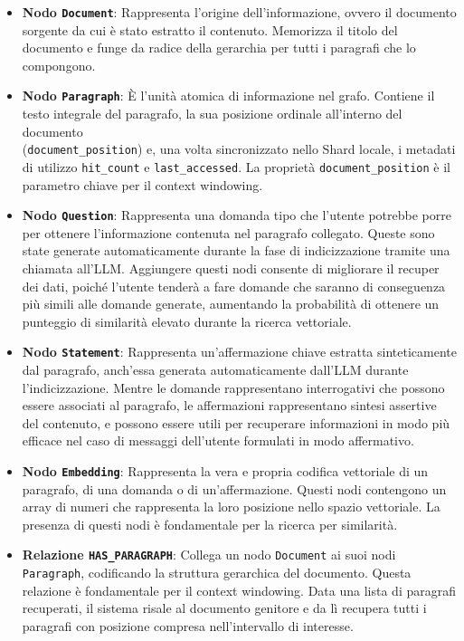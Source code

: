\begin{itemize}
    \item \textbf{Nodo \texttt{Document}}: Rappresenta l'origine dell'informazione, ovvero il documento sorgente da cui è stato estratto il contenuto. Memorizza il titolo del documento e funge da radice della gerarchia per tutti i paragrafi che lo compongono.

    \item \textbf{Nodo \texttt{Paragraph}}: È l'unità atomica di informazione nel grafo. Contiene il testo integrale del paragrafo, la sua posizione ordinale all'interno del documento \\ (\texttt{document\_position}) e, una volta sincronizzato nello Shard locale, i metadati di utilizzo \texttt{hit\_count} e \texttt{last\_accessed}. La proprietà \texttt{document\_position} è il parametro chiave per il context windowing.

    \item \textbf{Nodo \texttt{Question}}: Rappresenta una domanda tipo che l'utente potrebbe porre per ottenere l'informazione contenuta nel paragrafo collegato. Queste sono state generate automaticamente durante la fase di indicizzazione tramite una chiamata all'LLM. Aggiungere questi nodi consente di migliorare il recuper dei dati, poiché l'utente tenderà a fare domande che saranno di conseguenza più simili alle domande generate, aumentando la probabilità di ottenere un punteggio di similarità elevato durante la ricerca vettoriale.

    \item \textbf{Nodo \texttt{Statement}}: Rappresenta un'affermazione chiave estratta sinteticamente dal paragrafo, anch'essa generata automaticamente dall'LLM durante l'indicizzazione. Mentre le domande rappresentano interrogativi che possono essere associati al paragrafo, le affermazioni rappresentano sintesi assertive del contenuto, e possono essere utili per recuperare informazioni in modo più efficace nel caso di messaggi dell'utente formulati in modo affermativo.

    \item \textbf{Nodo \texttt{Embedding}}: Rappresenta la vera e propria codifica vettoriale di un paragrafo, di una domanda o di un'affermazione. Questi nodi contengono un array di numeri che rappresenta la loro posizione nello spazio vettoriale. La presenza di questi nodi è fondamentale per la ricerca per similarità.

    \item \textbf{Relazione \texttt{HAS\_PARAGRAPH}}: Collega un nodo \texttt{Document} ai suoi nodi \texttt{Paragraph}, codificando la struttura gerarchica del documento. Questa relazione è fondamentale per il context windowing. Data una lista di paragrafi recuperati, il sistema risale al documento genitore e da lì recupera tutti i paragrafi con posizione compresa nell'intervallo di interesse.


\end{itemize}
